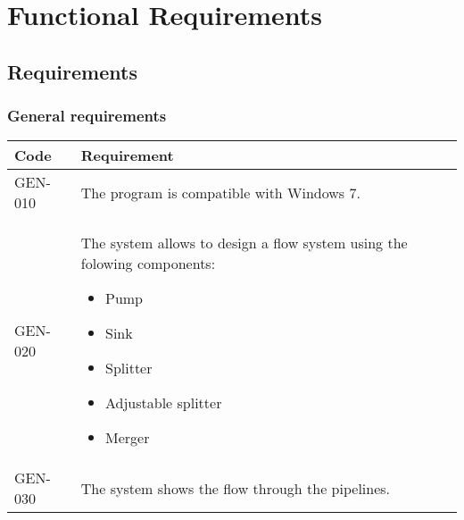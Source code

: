 \chapter{Functional Requirements}
\section{Requirements}
\subsection{General requirements}
\begin{tabularx}{\textwidth}{|p{2cm}X|}\hline
Code & Requirement \\\hline
GEN-010 & The program is compatible with Windows 7.\\\hline
GEN-020 & The system allows to design a flow system using the folowing components:
\begin{itemize}[noitemsep,nolistsep]
\item Pump
\item Sink
\item Splitter
\item Adjustable splitter 
\item Merger
\end{itemize}
\\\hline
GEN-030 & The system shows the flow through the pipelines.\\\hline
\end{tabularx}

